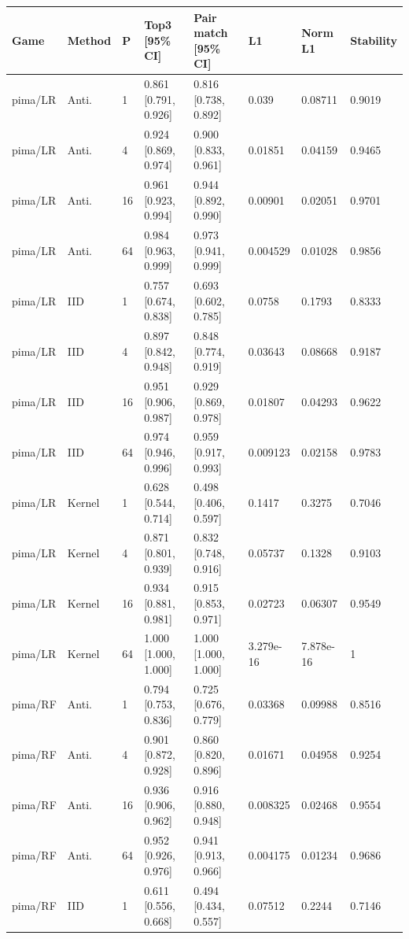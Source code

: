\begingroup\footnotesize\setlength{\tabcolsep}{3pt}
\begin{tabular}{llllllll}
\toprule
Game & Method & P & Top3 [95\% CI] & Pair match [95\% CI] & L1 & Norm L1 & Stability \\
\midrule
pima/LR & Anti. & 1 & 0.861 [0.791, 0.926] & 0.816 [0.738, 0.892] & 0.039 & 0.08711 & 0.9019 \\
pima/LR & Anti. & 4 & 0.924 [0.869, 0.974] & 0.900 [0.833, 0.961] & 0.01851 & 0.04159 & 0.9465 \\
pima/LR & Anti. & 16 & 0.961 [0.923, 0.994] & 0.944 [0.892, 0.990] & 0.00901 & 0.02051 & 0.9701 \\
pima/LR & Anti. & 64 & 0.984 [0.963, 0.999] & 0.973 [0.941, 0.999] & 0.004529 & 0.01028 & 0.9856 \\
pima/LR & IID & 1 & 0.757 [0.674, 0.838] & 0.693 [0.602, 0.785] & 0.0758 & 0.1793 & 0.8333 \\
pima/LR & IID & 4 & 0.897 [0.842, 0.948] & 0.848 [0.774, 0.919] & 0.03643 & 0.08668 & 0.9187 \\
pima/LR & IID & 16 & 0.951 [0.906, 0.987] & 0.929 [0.869, 0.978] & 0.01807 & 0.04293 & 0.9622 \\
pima/LR & IID & 64 & 0.974 [0.946, 0.996] & 0.959 [0.917, 0.993] & 0.009123 & 0.02158 & 0.9783 \\
pima/LR & Kernel & 1 & 0.628 [0.544, 0.714] & 0.498 [0.406, 0.597] & 0.1417 & 0.3275 & 0.7046 \\
pima/LR & Kernel & 4 & 0.871 [0.801, 0.939] & 0.832 [0.748, 0.916] & 0.05737 & 0.1328 & 0.9103 \\
pima/LR & Kernel & 16 & 0.934 [0.881, 0.981] & 0.915 [0.853, 0.971] & 0.02723 & 0.06307 & 0.9549 \\
pima/LR & Kernel & 64 & 1.000 [1.000, 1.000] & 1.000 [1.000, 1.000] & 3.279e-16 & 7.878e-16 & 1 \\
pima/RF & Anti. & 1 & 0.794 [0.753, 0.836] & 0.725 [0.676, 0.779] & 0.03368 & 0.09988 & 0.8516 \\
pima/RF & Anti. & 4 & 0.901 [0.872, 0.928] & 0.860 [0.820, 0.896] & 0.01671 & 0.04958 & 0.9254 \\
pima/RF & Anti. & 16 & 0.936 [0.906, 0.962] & 0.916 [0.880, 0.948] & 0.008325 & 0.02468 & 0.9554 \\
pima/RF & Anti. & 64 & 0.952 [0.926, 0.976] & 0.941 [0.913, 0.966] & 0.004175 & 0.01234 & 0.9686 \\
pima/RF & IID & 1 & 0.611 [0.556, 0.668] & 0.494 [0.434, 0.557] & 0.07512 & 0.2244 & 0.7146 \\

\end{tabular}
